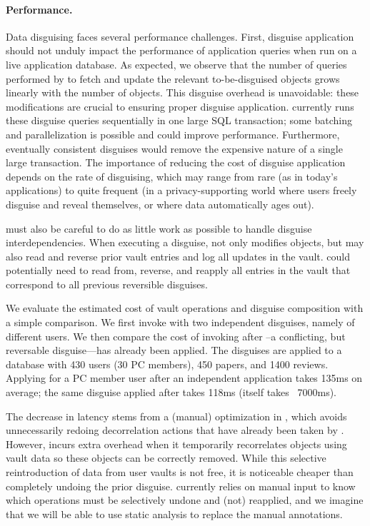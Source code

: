 \paragraph{Performance.}
\label{sec:perf}

Data disguising faces several performance challenges.
%
First, disguise application should not unduly impact the performance of application queries
when run on a live application database.
As expected, we observe that the number of queries performed by \sys to fetch and update the relevant
to-be-disguised objects grows linearly with the number of objects. This disguise overhead is
unavoidable: these modifications are crucial to ensuring proper disguise application.
\sys currently runs these disguise queries sequentially in one large SQL transaction; some batching and parallelization is possible and could improve performance.
%
Furthermore, eventually consistent disguises would remove the expensive nature of a single large
transaction. The importance of reducing the cost of disguise application depends on the rate of
disguising, which may range from rare (as in today's applications) to quite frequent (in a
privacy-supporting world where users freely disguise and reveal themselves, or where data
automatically ages out).

%
\sys must also be careful to do as little work as possible to handle disguise interdependencies.
When executing a disguise, \sys not only modifies objects, but may also read and reverse prior
vault entries and log all updates in the vault.
%
\sys could potentially need to read from, reverse, and reapply all entries in the vault that correspond
to all previous reversible disguises.

We evaluate the estimated cost of vault operations and disguise composition with a simple
comparison. We first invoke \sys with two independent disguises, namely \hrtbf of different
users. We then compare the cost of invoking \hrtbf after \hconfanon--a conflicting, but reversable
disguise---has already been applied.
The disguises are applied to a database with 430 users (30 PC members), 450 papers, and 1400
reviews.
Applying \hrtbf for a PC member user after an independent \hrtbf application takes 135ms on average;
the same \hrtbf disguise applied after \hconfanon takes 118ms (\hconfanon itself takes
   ~7000ms). 

The decrease in latency stems from a (manual) optimization in \sys, which avoids unnecessarily
redoing decorrelation actions that have already been taken by \hconfanon.  However, \sys incurs
extra overhead when it temporarily recorrelates objects using vault data so these objects can be
correctly removed. While this selective reintroduction of data from user vaults is not free, it
is noticeable cheaper than completely undoing the prior \hconfanon disguise.
\sys currently relies on manual input to know which operations must be selectively undone and (not)
reapplied, and we imagine that we will be able to use static analysis to replace the manual
annotations.
